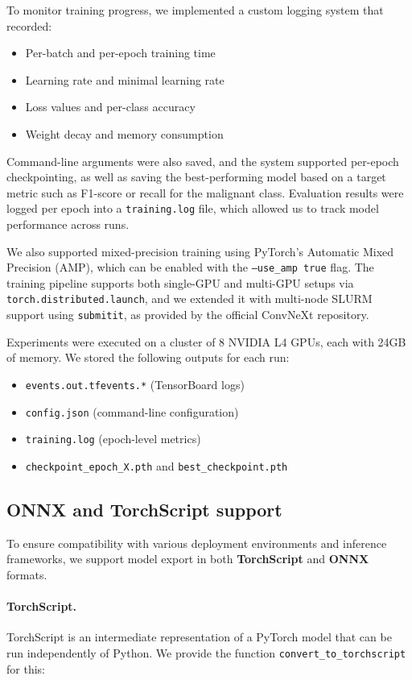 To monitor training progress, we implemented a custom logging system that recorded:
\begin{itemize}
    \item Per-batch and per-epoch training time
    \item Learning rate and minimal learning rate
    \item Loss values and per-class accuracy
    \item Weight decay and memory consumption
\end{itemize}

Command-line arguments were also saved, and the system supported per-epoch checkpointing, as well as saving the best-performing model based on a target metric such as F1-score or recall for the malignant class. Evaluation results were logged per epoch into a \texttt{training.log} file, which allowed us to track model performance across runs.

We also supported mixed-precision training using PyTorch’s Automatic Mixed Precision (AMP), which can be enabled with the \texttt{--use\_amp true} flag. The training pipeline supports both single-GPU and multi-GPU setups via \texttt{torch.distributed.launch}, and we extended it with multi-node SLURM support using \texttt{submitit}, as provided by the official ConvNeXt repository.

Experiments were executed on a cluster of 8 NVIDIA L4 GPUs, each with 24GB of memory. We stored the following outputs for each run:
\begin{itemize}
    \item \texttt{events.out.tfevents.*} (TensorBoard logs)
    \item \texttt{config.json} (command-line configuration)
    \item \texttt{training.log} (epoch-level metrics)
    \item \texttt{checkpoint\_epoch\_X.pth} and \texttt{best\_checkpoint.pth}
\end{itemize}

\subsection{ONNX and TorchScript support}

To ensure compatibility with various deployment environments and inference frameworks, we support model export in both \textbf{TorchScript} and \textbf{ONNX} formats.

\paragraph{TorchScript.}
TorchScript is an intermediate representation of a PyTorch model that can be run independently of Python. We provide the function \texttt{convert\_to\_torchscript} for this:

